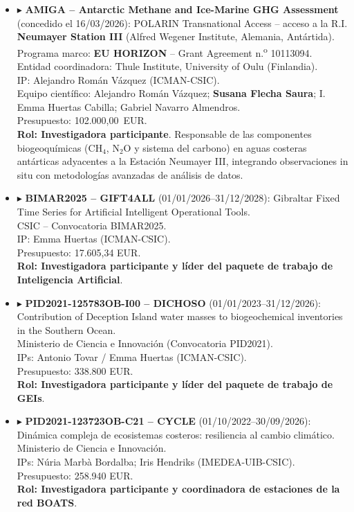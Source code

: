 \documentclass[11pt,a4paper]{article}
\begin{document}
\begin{itemize}[leftmargin=*]
    \item $\blacktriangleright$ \textbf{AMIGA -- Antarctic Methane and Ice-Marine GHG Assessment} (concedido el 16/03/2026):
    POLARIN Transnational Access -- acceso a la R.I. \textbf{Neumayer Station III} (Alfred Wegener Institute, Alemania, Antártida).\\
    Programa marco: \textbf{EU HORIZON} -- Grant Agreement n.\textsuperscript{o} 10113094.\\
    Entidad coordinadora: Thule Institute, University of Oulu (Finlandia).\\
    IP: Alejandro Román Vázquez (ICMAN-CSIC).\\
    Equipo científico: Alejandro Román Vázquez; \textbf{Susana Flecha Saura}; I. Emma Huertas Cabilla; Gabriel Navarro Almendros.\\
    Presupuesto: 102.000,00~EUR.\\
    \textbf{Rol: Investigadora participante}. Responsable de las componentes biogeoquímicas (CH$_4$, N$_2$O y sistema del carbono) en aguas costeras antárticas adyacentes a la Estación Neumayer III, integrando observaciones in situ con metodologías avanzadas de análisis de datos.

    \item $\blacktriangleright$ \textbf{BIMAR2025 – GIFT4ALL} (01/01/2026--31/12/2028):
    Gibraltar Fixed Time Series for Artificial Intelligent Operational Tools.\\
    CSIC – Convocatoria BIMAR2025.\\
    IP: Emma Huertas (ICMAN-CSIC).\\
    Presupuesto: 17.605,34 EUR.\\
    \textbf{Rol: Investigadora participante y líder del paquete de trabajo de Inteligencia Artificial}.

    \item $\blacktriangleright$ \textbf{PID2021-125783OB-I00 – DICHOSO} (01/01/2023--31/12/2026):
    Contribution of Deception Island water masses to biogeochemical inventories in the Southern Ocean.\\
    Ministerio de Ciencia e Innovación (Convocatoria PID2021).\\
    IPs: Antonio Tovar / Emma Huertas (ICMAN-CSIC).\\
    Presupuesto: 338.800 EUR.\\
    \textbf{Rol: Investigadora participante y líder del paquete de trabajo de GEIs}.

    \item $\blacktriangleright$ \textbf{PID2021-123723OB-C21 – CYCLE} (01/10/2022--30/09/2026):
    Dinámica compleja de ecosistemas costeros: resiliencia al cambio climático.\\
    Ministerio de Ciencia e Innovación.\\
    IPs: Núria Marbà Bordalba; Iris Hendriks (IMEDEA-UIB-CSIC).\\
    Presupuesto: 258.940 EUR.\\
    \textbf{Rol: Investigadora participante y coordinadora de estaciones de la red BOATS}.


\end{itemize}
\end{document}
